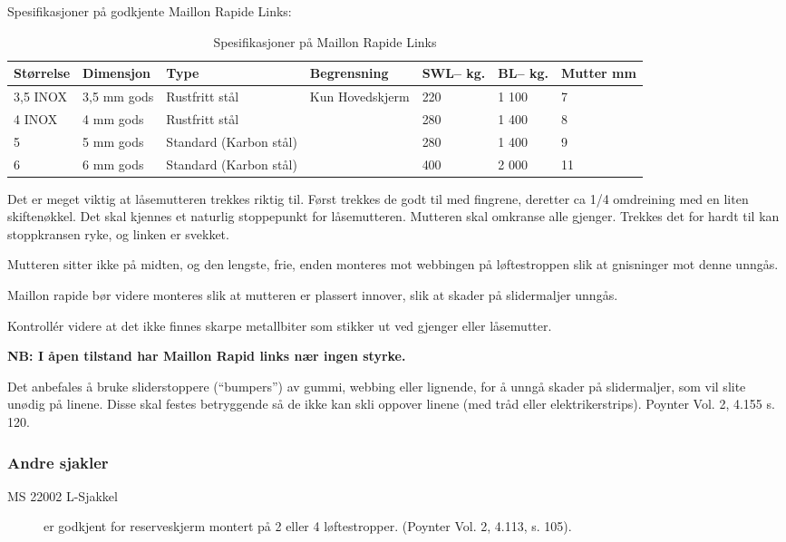 Spesifikasjoner på godkjente Maillon Rapide Links:
\begin{table}
	\caption{Spesifikasjoner på Maillon Rapide Links}
	\begin{tabular}{ | l | l | l | l | l | l | l | }
		\hline
		Størrelse & Dimensjon & Type & Begrensning & SWL\footnotemark – kg. & BL\footnotemark – kg. & Mutter mm \\
		\hline
		3,5 INOX\footnotemark & 3,5 mm gods & Rustfritt stål & Kun Hovedskjerm & 220 & 1 100 & 7 \\
		\hline
		4 INOX & 4 mm gods & Rustfritt stål & & 280 & 1 400 & 8 \\
		\hline
		5 & 5 mm gods & Standard (Karbon stål) & & 280 & 1 400 & 9 \\
		\hline
		6 & 6 mm gods & Standard (Karbon stål) & & 400 & 2 000 & 11 \\
		\hline
	\end{tabular}
\end{table}

Det er meget viktig at låsemutteren trekkes riktig til. Først trekkes de godt til med fingrene, deretter ca 1/4 omdreining med en liten skiftenøkkel. Det skal kjennes et naturlig stoppepunkt for låsemutteren. Mutteren skal omkranse alle gjenger. Trekkes det for hardt til kan stoppkransen ryke, og linken er svekket.

Mutteren sitter ikke på midten, og den lengste, frie, enden monteres mot webbingen på løftestroppen slik at gnisninger mot denne unngås.

Maillon rapide bør videre monteres slik at mutteren er plassert innover, slik at skader på slidermaljer unngås.

Kontrollér videre at det ikke finnes skarpe metallbiter som stikker ut ved gjenger eller låsemutter.

\textbf{NB: I åpen tilstand har Maillon Rapid links nær ingen styrke.}

Det anbefales å bruke sliderstoppere (``bumpers'') av gummi, webbing eller lignende, for å unngå skader på slidermaljer, som vil slite unødig på linene. Disse skal festes betryggende så de ikke kan skli oppover linene (med tråd eller elektrikerstrips). Poynter Vol. 2, 4.155 s. 120.

\subsubsection{Andre sjakler}
\begin{description}
	\item[MS 22002 L-Sjakkel] er godkjent for reserveskjerm montert på 2 eller 4 løftestropper. (Poynter Vol. 2, 4.113, s. 105).
\end{description}

